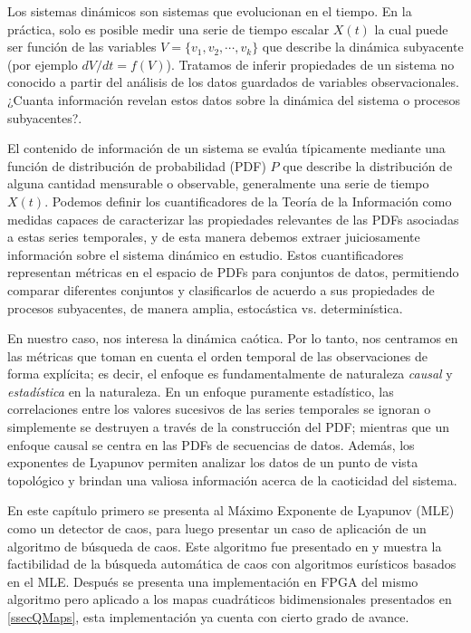 Los sistemas dinámicos son sistemas que evolucionan en el tiempo.
En la práctica, solo es posible medir una serie de tiempo escalar $X(t)$ la cual puede ser función de las variables $V=\{ v_1, v_2,\cdots, v_k\}$ que describe la dinámica subyacente (por ejemplo $dV/dt=f(V)$).
Tratamos de inferir propiedades de un sistema no conocido a partir del análisis de los datos guardados de variables observacionales.
¿Cuanta información revelan estos datos sobre la dinámica del sistema o procesos subyacentes?.

El contenido de información de un sistema se evalúa típicamente mediante una función de distribución de probabilidad (PDF) $P$ que describe la distribución de alguna cantidad mensurable o observable, generalmente una serie de tiempo $X(t)$.
Podemos definir los cuantificadores de la Teoría de la Información como medidas capaces de caracterizar las propiedades relevantes de las PDFs asociadas a estas series temporales, y de esta manera debemos extraer juiciosamente información sobre el sistema dinámico en estudio.
Estos cuantificadores representan métricas en el espacio de PDFs para conjuntos de datos, permitiendo comparar diferentes conjuntos y clasificarlos de acuerdo a sus propiedades de procesos subyacentes, de manera amplia, estocástica vs. determinística.

En nuestro caso, nos interesa la dinámica caótica.
Por lo tanto, nos centramos en las métricas que toman en cuenta el orden temporal de las observaciones de forma explícita; es decir, el enfoque es fundamentalmente de naturaleza \textit{causal} y \textit{estadística} en la naturaleza.
En un enfoque puramente estadístico, las correlaciones entre los valores sucesivos de las series temporales se ignoran o simplemente se destruyen a través de la construcción del PDF; mientras que un enfoque causal se centra en las PDFs de secuencias de datos.
Además, los exponentes de Lyapunov permiten analizar los datos de un punto de vista topológico y brindan una valiosa información acerca de la caoticidad del sistema.

En este capítulo primero se presenta al Máximo Exponente de Lyapunov (MLE) como un detector de caos, para luego presentar un caso de aplicación de un algoritmo de búsqueda de caos.
Este algoritmo fue presentado en \cite{CASE2013} y muestra la factibilidad de la búsqueda automática de caos con algoritmos eurísticos basados en el  MLE.
Después se presenta una implementación en FPGA del mismo algoritmo pero aplicado a los mapas cuadráticos bidimensionales presentados en \ref{ssecQMaps}, esta implementación ya cuenta con cierto grado de avance.

